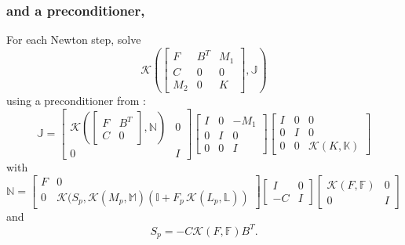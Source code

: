 \documentclass[presentation,aspectratio=43]{beamer}
\newcommand{\KSP}[2]{\ensuremath{\mathcal{K}\left(#1, \mathbb{#2}\right)}}
\newcommand{\ksp}[1]{\KSP{#1}{#1}}
\begin{document}
\begin{frame}
  \frametitle{and a preconditioner,}
  {\small
  For each Newton step, solve
  \begin{equation*}
    \KSP{\begin{bmatrix}
        F & B^T & M_1\\
        C & 0 & 0 \\
        M_2 & 0 & K
      \end{bmatrix}}{J}
  \end{equation*}
  using a preconditioner from \textcite{Howle:2012}:
  \begin{equation*}
    \mathbb{J} =
    \begin{bmatrix}
      \KSP{\begin{bmatrix}
          F & B^T\\
          C & 0
        \end{bmatrix}}{N} & 0\\
      0 & I
    \end{bmatrix}
    \begin{bmatrix}
      I & 0 & -M_1\\
      0 & I & 0 \\
      0 & 0 & I
    \end{bmatrix}
    \begin{bmatrix}
      I & 0 & 0\\
      0 & I & 0\\
      0 & 0 &\ksp{K}
    \end{bmatrix}
  \end{equation*}
  with
  \begin{equation*}
    \mathbb{N} = \begin{bmatrix}
      F & 0 \\
      0 & \mathcal{K}(S_p, \KSP{M_p}{M}(\mathbb{I} + F_p \, \KSP{L_p}{L})
    \end{bmatrix}
    \begin{bmatrix}
      I & 0\\
      -C & I
    \end{bmatrix}
    \begin{bmatrix}
      \ksp{F} & 0 \\
      0 & I
    \end{bmatrix}
  \end{equation*}
  and
  \begin{equation*}
    S_p = -C \ksp{F} B^T.
  \end{equation*}
}
\end{frame}
\end{document}
